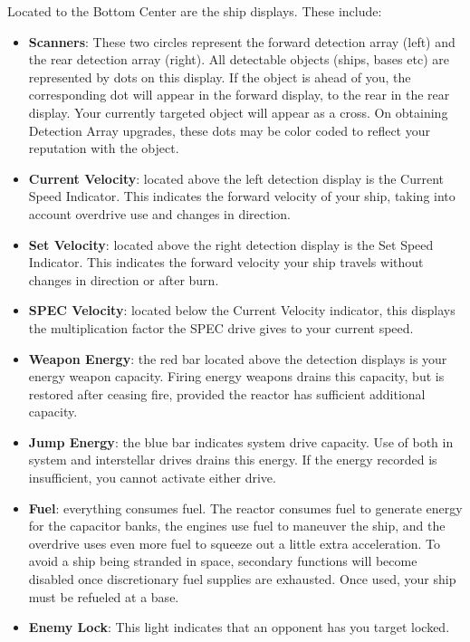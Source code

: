 \documentclass{article}
\begin{document}
Located to the Bottom Center are the ship displays. These include: 

\begin{itemize}
\item  \textbf{Scanners}: These two circles represent the forward detection array (left) and the rear detection array (right). All detectable objects (ships, bases etc) are represented by dots on this display. If the object is ahead of you, the corresponding dot will appear in the forward display, to the rear in the rear display. Your currently targeted object will appear as a cross. On obtaining Detection Array upgrades, these dots may be color coded to reflect your reputation with the object. 

\item  \textbf{Current Velocity}: located above the left detection display is the Current Speed Indicator. This indicates the forward velocity of your ship, taking into account overdrive use and changes in direction. 

\item  \textbf{Set Velocity}: located above the right detection display is the Set Speed Indicator. This indicates the forward velocity your ship travels without changes in direction or after burn. 

\item  \textbf{SPEC Velocity}: located below the Current Velocity indicator, this displays the multiplication factor the SPEC drive gives to your current speed. 

\item  \textbf{Weapon Energy}: the red bar located above the detection displays is your energy weapon capacity. Firing energy weapons drains this capacity, but is restored after ceasing fire, provided the reactor has sufficient additional capacity. 

\item  \textbf{Jump Energy}: the blue bar indicates system drive capacity. Use of both in system and interstellar drives drains this energy. If the energy recorded is insufficient, you cannot activate either drive. 

\item  \textbf{Fuel}: everything consumes fuel. The reactor consumes fuel to generate energy for the capacitor banks, the engines use fuel to maneuver the ship, and the overdrive uses even more fuel to squeeze out a little extra acceleration. To avoid a ship being stranded in space, secondary functions will become disabled once discretionary fuel supplies are exhausted. Once used, your ship must be refueled at a base. 

\item  \textbf{Enemy Lock}: This light indicates that an opponent has you target locked. 
\end{itemize}
\end{document}
